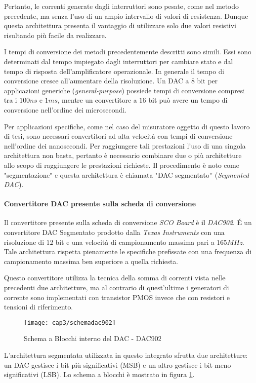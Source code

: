 Pertanto, le correnti generate dagli interruttori sono pesate, come nel metodo precedente, ma senza l'uso di un ampio intervallo di valori di resistenza. Dunque questa architettura presenta il vantaggio di utilizzare solo due valori resistivi risultando più facile da realizzare.

I tempi di conversione dei metodi precedentemente descritti sono simili. Essi sono determinati dal tempo impiegato dagli interruttori per cambiare stato e dal tempo di risposta dell'amplificatore operazionale. In generale il tempo di conversione cresce all'aumentare della risoluzione. Un DAC a $8$ bit per applicazioni generiche (\textit{general-purpose}) possiede tempi di conversione compresi tra i $100ns$ e $1ms$, mentre un convertitore a $16$ bit può avere un tempo di conversione nell'ordine dei microsecondi.

Per applicazioni specifiche, come nel caso del misuratore oggetto di questo lavoro di tesi, sono necessari convertitori ad alta velocità con tempi di conversione nell'ordine dei nanosecondi. Per raggiungere tali prestazioni l'uso di una singola architettura non basta, pertanto è necessario combinare due o più architetture allo scopo di raggiungere le prestazioni richieste. Il procedimento è noto come "segmentazione" e questa  architettura è chiamata "DAC segmentato” (\textit{Segmented DAC}). 

\paragraph{Convertitore DAC presente sulla scheda di conversione}
Il convertitore presente sulla scheda di conversione \textit{SCO Board} è il \textit{DAC902}. \'E un convertitore DAC Segmentato prodotto dalla \textit{Texas Instruments} con una risoluzione di $12$ bit e una velocità di campionamento massima pari a $165MHz$.
Tale architettura rispetta pienamente le specifiche prefissate con una frequenza di campionamento massima ben superiore a quella richiesta.

Questo convertitore utilizza la tecnica della somma di correnti vista nelle precedenti due architetture, ma al contrario di quest'ultime i generatori di corrente sono implementati con transistor PMOS invece che con resistori e tensioni di riferimento.
\begin{figure}  
  \begin{center}
    \texttt{[image: cap3/schemadac902]}
    \caption{Schema a Blocchi interno del DAC - DAC902}
    \label{schemadac902}
  \end{center}
\end{figure}
L'architettura segmentata utilizzata in questo integrato sfrutta due architetture: un DAC gestisce i bit più significativi (MSB) e un altro gestisce i bit meno significativi (LSB). Lo schema a blocchi è mostrato in figura \ref{schemadac902}.

